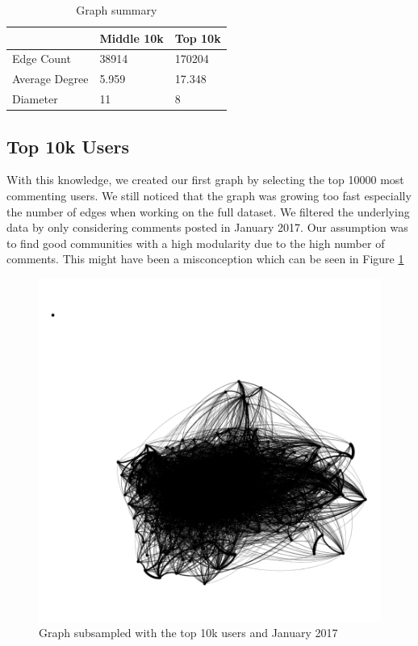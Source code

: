 \documentclass[sigconf]{acmart}
\begin{document}
\begin{table}[H]
\centering
\begin{tabular}{|l|l|l|}
\hline
               & Middle 10k & Top 10k \\ \hline
Edge Count     & 38914      & 170204   \\ \hline
Average Degree & 5.959      & 17.348  \\ \hline
Diameter       & 11         & 8       \\ \hline
\end{tabular}
\caption{Graph summary}
\label{graph_sum}
\end{table}

\subsection{Top 10k Users}

With this knowledge, we created our first graph by selecting the top 10000 most commenting users. We still noticed that the graph was growing too fast especially the number of edges when working on the full dataset.
We filtered the underlying data by only considering comments posted in January 2017.
Our assumption was to find good communities with a high modularity due to the high number of comments. 
This might have been a misconception which can be seen in Figure \ref{fig:top_10k} 

\begin{figure}[H]
    \includegraphics[width=\textwidth / 2]{images/top_10k.png}
    \caption{Graph subsampled with the top 10k users and January 2017}
    \label{fig:top_10k}
\end{figure}
\end{document}
